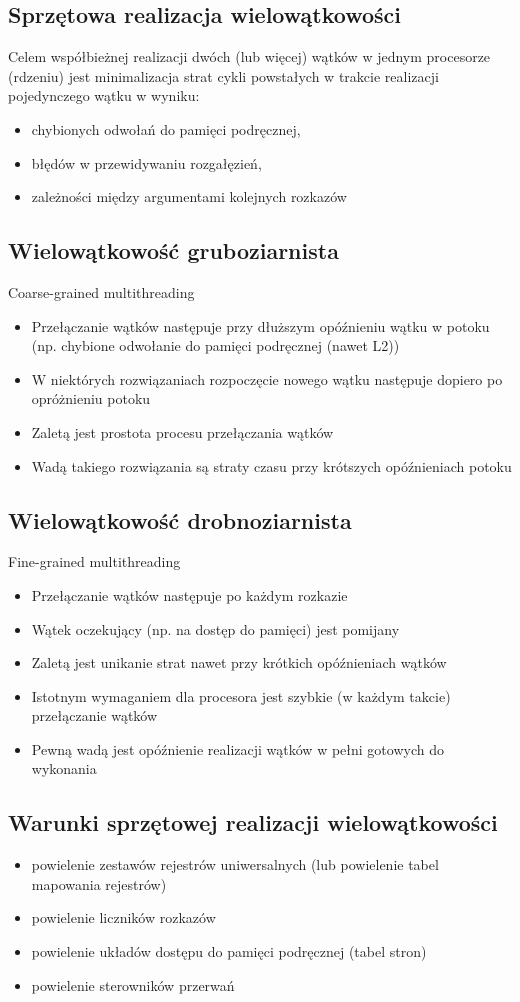 	\subsection{Sprzętowa realizacja wielowątkowości}
		Celem współbieżnej realizacji dwóch (lub więcej) wątków w jednym procesorze (rdzeniu) jest minimalizacja strat cykli powstałych w trakcie realizacji pojedynczego wątku w wyniku:
		\begin{itemize}
			\item chybionych odwołań do pamięci podręcznej,
			\item błędów w przewidywaniu rozgałęzień,
			\item zależności między argumentami kolejnych rozkazów
		\end{itemize}
	\subsection{Wielowątkowość gruboziarnista}
		Coarse-grained multithreading
		\begin{itemize}
			\item Przełączanie wątków następuje przy dłuższym opóźnieniu wątku w potoku (np. chybione odwołanie do pamięci podręcznej (nawet L2))
			\item W niektórych rozwiązaniach rozpoczęcie nowego wątku następuje dopiero po opróżnieniu potoku
			\item Zaletą jest prostota procesu przełączania wątków
			\item Wadą takiego rozwiązania są straty czasu przy krótszych opóźnieniach potoku
		\end{itemize}
	\subsection{Wielowątkowość drobnoziarnista}
		Fine-grained multithreading
		\begin{itemize}
			\item Przełączanie wątków następuje po każdym rozkazie
			\item Wątek oczekujący (np. na dostęp do pamięci) jest pomijany
			\item Zaletą jest unikanie strat nawet przy krótkich opóźnieniach wątków
			\item Istotnym wymaganiem dla procesora jest szybkie (w każdym takcie) przełączanie wątków
			\item Pewną wadą jest opóźnienie realizacji wątków w pełni gotowych do wykonania
		\end{itemize}
	\subsection{Warunki sprzętowej realizacji wielowątkowości}
		\begin{itemize}
			\item powielenie zestawów rejestrów uniwersalnych (lub powielenie tabel mapowania rejestrów)
			\item powielenie liczników rozkazów
			\item powielenie układów dostępu do pamięci podręcznej (tabel stron)
			\item powielenie sterowników przerwań
		\end{itemize}
